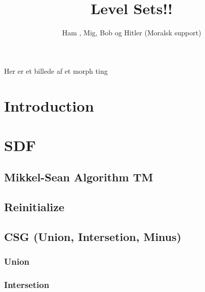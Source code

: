 \documentclass[a4paper, oneside]{memoir}
\title{Level Sets!!}
\author{Ham , Mig, Bob og Hitler (Moralsk support)}
\begin{document}
\maketitle{}

Her er et billede af et morph ting

\begin{comment}
|----------------------------+----------+--------|
| Afsnit                     | Indhold  | Hvem   |
|----------------------------+----------+--------|
| Intro                      | ch. 1,2  | have   |
| Build SDF / Discretization | artikel? | vester |
| Reinitialize               | ch. 7    | cpvc   |
| Motion                     | ch. 4,6  | ptx    |
| Externally gen. vf.        | ch. 3    | geggie |
| Godunov                    | ch. 5    | cpvc   |
|----------------------------+----------+--------|
\end{comment}

\newpage

\tableofcontents{}

\chapter{Introduction}
\label{chap:introduction}
  

\chapter{SDF}
\label{chap:sdf}

\section{Mikkel-Sean Algorithm TM}

\section{Reinitialize}
\label{sec:reinitialize}

\section{CSG (Union, Intersetion, Minus)}
\subsection{Union}
\subsection{Intersetion}
\end{document}

